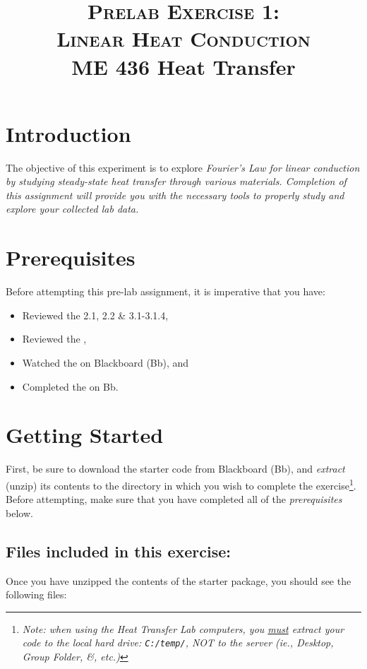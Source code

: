\documentclass[11pt, letterpaper]{article}
\title{ \textsc{Prelab Exercise 1: \\ Linear Heat Conduction} \\ {\large  \color{darkgray} ME 436 Heat Transfer}}
\begin{document}
\date{}
\maketitle
\thispagestyle{firstpage} 

\section*{Introduction}

The objective of this experiment is to explore \it{Fourier’s Law} for linear conduction by studying steady-state heat transfer through various materials. Completion of this assignment will provide you with the necessary tools to properly study and explore your collected lab data.

\section*{Prerequisites}
Before attempting this pre-lab assignment, it is imperative that you have:
{\small
\begin{itemize}
    \item Reviewed the  2.1, 2.2 \& 3.1-3.1.4,
    \item Reviewed the , 
    \item Watched the  on Blackboard (Bb), and
    \item Completed the  on Bb.
\end{itemize}
}

\section*{Getting Started}
First, be sure to download the starter code from Blackboard (Bb), and \textit{extract} (unzip) its contents to the directory in which you wish to complete the exercise\footnote{\textit{Note: when using the Heat Transfer Lab computers, you \ul{must} extract your code to the local hard drive: \texttt{C:/temp/}, NOT to the server (ie., Desktop, Group Folder, \&, etc.)}}. Before attempting, make sure that you have completed all of the \textit{prerequisites} below.

\subsection*{Files included in this exercise:}
Once you have unzipped the contents of the starter package, you should see the following files:
\end{document}
